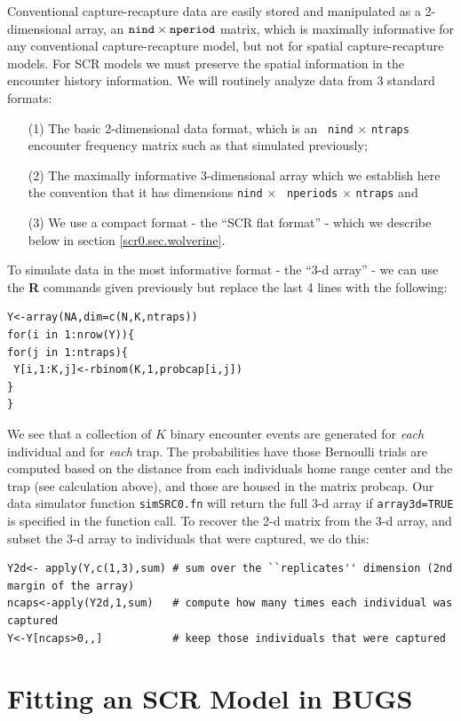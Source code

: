 Conventional capture-recapture data are easily stored and manipulated
as a 2-dimensional array, an $\mbox{\tt nind} \times \mbox{\tt
  nperiod}$ matrix, which is maximally informative for any
conventional capture-recapture model, but not for spatial
capture-recapture models.  For SCR models we must preserve the spatial
information in the encounter history information. We will routinely
analyze data from 3 standard formats:
\begin{itemize}
\item[(1)] The basic 2-dimensional data format, which is an \mbox{\tt
    nind} $\times$ \mbox{\tt ntraps} encounter frequency matrix such as that simulated previously; 
\item[(2)] The maximally informative 3-dimensional array which we
  establish here the 
convention that it has dimensions \mbox{\tt nind} $\times$ \mbox{\tt
  nperiods} $\times$ \mbox{\tt ntraps} and 
\item[(3)] We use a compact format - the ``SCR flat format'' - which
  we describe below  in section \ref{scr0.sec.wolverine}.
\end{itemize}
To simulate data in the most informative format - the ``3-d array'' -
we can use the {\bf R} commands given previously but replace the last 4 lines with the following: 
\begin{verbatim}
Y<-array(NA,dim=c(N,K,ntraps))
for(i in 1:nrow(Y)){
for(j in 1:ntraps){
 Y[i,1:K,j]<-rbinom(K,1,probcap[i,j])
}
}
\end{verbatim}
We see that a collection of $K$ binary encounter events are generated
for {\it each} individual and for {\it each} trap.  The probabilities
have those Bernoulli trials are computed based on the distance from
each individuals home range center and the trap (see calculation
above), and those are housed in the matrix probcap. Our data simulator
function \mbox{\tt simSRC0.fn} will return the full 3-d array if
\mbox{\tt array3d=TRUE} is specified in the function call.  To recover
the 2-d matrix from the 3-d array, and subset the 3-d array to
individuals that were captured, we do this:
\begin{verbatim}
Y2d<- apply(Y,c(1,3),sum) # sum over the ``replicates'' dimension (2nd margin of the array)
ncaps<-apply(Y2d,1,sum)   # compute how many times each individual was captured
Y<-Y[ncaps>0,,]           # keep those individuals that were captured
\end{verbatim}



\section{Fitting an SCR Model in BUGS}
\label{scr0.sec.winbugs1}

